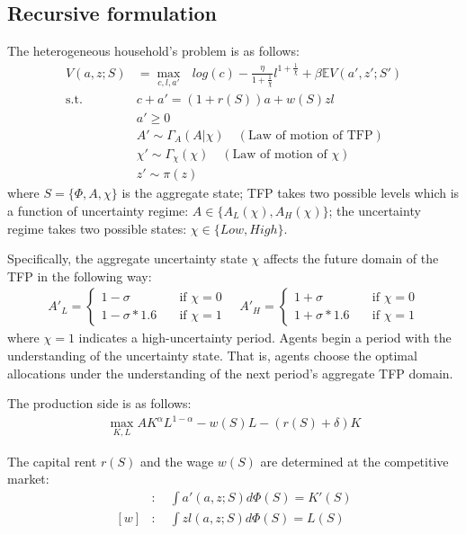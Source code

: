 \subsection*{Recursive formulation}
The heterogeneous household's problem is as follows:
\begin{align*}
  V(a,z;S) &= \max_{c,l,a'}\text{ } log(c) - \frac{\eta}{1+\frac{1}{\chi}}l^{1+\frac{1}{\chi}}+ \beta \mathbb{E}V(a',z';S')
  \\
  \text{s.t.}\quad& c + a' = (1+r(S))a + w(S)zl
  \\
  & a'\geq 0
  \\
  & A' \sim \Gamma_{A}(A|\chi) \quad(\text{Law of motion of TFP})
  \\
  & \chi' \sim \Gamma_{\chi}(\chi) \quad(\text{Law of motion of $\chi$})
  \\
  & z' \sim \pi(z)
\end{align*}
where $S = \{\Phi,A,\chi\}$ is the aggregate state; TFP takes two possible levels which is a function of uncertainty regime: $A\in\{A_{L}(\chi),A_{H}(\chi)\}$; the uncertainty regime takes two possible states: $\chi\in\{Low,High\}$.

Specifically, the aggregate uncertainty state $\chi$ affects the future domain of the TFP in the following way:
\begin{align*}
  A'_{L} = 
  \begin{cases}
    1 - \sigma \quad &\text{if } \chi = 0
    \\
    1 - \sigma*1.6 \quad &\text{if } \chi =1
  \end{cases}
  \quad
  A'_{H} = 
  \begin{cases}
    1 + \sigma \quad &\text{if } \chi = 0
    \\
    1 + \sigma*1.6 \quad &\text{if } \chi =1
  \end{cases}
\end{align*}
where $\chi=1$ indicates a high-uncertainty period. 
  Agents begin a period with the understanding of the uncertainty state. That is, agents choose the optimal allocations under the understanding of the next period's aggregate TFP domain.

The production side is as follows:
\begin{align*}
  \max_{K,L} A K^{\alpha}L^{1-\alpha} - w(S)L - (r(S)+\delta)K
\end{align*}

The capital rent $r(S)$ and the wage $w(S)$ are determined at the competitive market:
\begin{align*}
  [r]&:\quad \int a'(a,z;S)d\Phi(S) = K'(S)
  \\
  [w]&:\quad \int z l(a,z;S) d\Phi(S) = L(S)
\end{align*}
